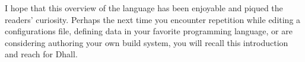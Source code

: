 \documentclass[12pt]{diazessay}
\begin{document}
I hope that this overview of the language has been enjoyable and piqued the readers' curiosity.
Perhaps the next time you encounter repetition while editing a configurations file, defining data in your favorite programming language, or are considering authoring your own build system, you will recall this introduction and reach for Dhall.


\pagebreak



\end{document}
